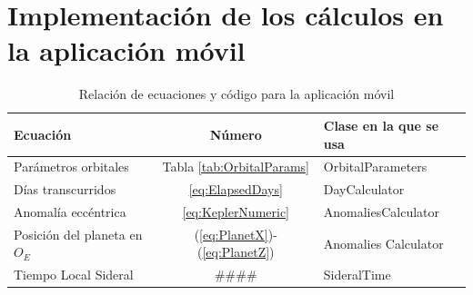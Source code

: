 \documentclass[a4paper,10pt]{article}
\begin{document}
\section{Implementación de los cálculos en la aplicación móvil}
\begin{table}[!h]
  \centering
  \begin{tabular}{lcl}
    Ecuación & Número & Clase en la que se usa\\
    \hline
    Parámetros orbitales & Tabla \ref{tab:OrbitalParams} & OrbitalParameters\\
    Días transcurridos & \ref{eq:ElapsedDays} & DayCalculator\\
    Anomalía eccéntrica & \ref{eq:KeplerNumeric} & AnomaliesCalculator\\
    Posición del planeta en $O_E$ & (\ref{eq:PlanetX})-(\ref{eq:PlanetZ}) & Anomalies Calculator\\
    Tiempo Local Sideral & \#\#\#\# & SideralTime\\
    \hline
  \end{tabular}
  \caption{Relación de ecuaciones y código para la aplicación móvil}
  \label{tab:EqsAndCode}
\end{table}
\end{document}
